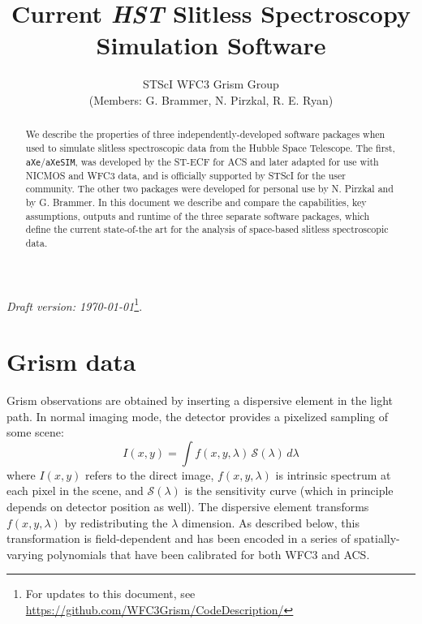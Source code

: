 \documentclass[preprint]{aastex}
\begin{document}
\title{Current \textit{HST} Slitless Spectroscopy Simulation Software}

\author{STScI WFC3 Grism Group \\ (Members: G. Brammer, N. Pirzkal, R. E. Ryan)}

\begin{abstract}
    We describe the properties of three independently-developed software packages when used to simulate slitless spectroscopic data from the Hubble Space Telescope.  The first, \texttt{aXe}/\texttt{aXeSIM}, was developed by the ST-ECF for ACS and later adapted for use with NICMOS and WFC3 data,  and is officially supported by STScI for the user community.  The other two packages were developed for personal use by N. Pirzkal and by G. Brammer.  In this document we describe and compare the capabilities, key assumptions, outputs and runtime of the three separate software packages, which define the current state-of-the art for the analysis of space-based slitless spectroscopic data.
    
\end{abstract}

\textit{Draft version: \today}\footnote{For updates to this document, see
\url{https://github.com/WFC3Grism/CodeDescription/}}.

\section{Grism data}




Grism observations are obtained by inserting a dispersive element in the light path.  In normal imaging mode, the detector provides a pixelized sampling of some scene:
\begin{dmath}
I(x,y) = \int f(x,y,\lambda)\,\mathcal{S}(\lambda)\,d\lambda
\end{dmath}
where $I(x,y)$ refers to the direct image, $f(x,y,\lambda)$ is intrinsic spectrum at each pixel in the scene, and $\mathcal{S}(\lambda)$ is the sensitivity curve (which in principle depends on detector position as well). The dispersive element transforms $f(x,y,\lambda)$ by redistributing the $\lambda$ dimension.  As described below, this transformation is field-dependent and has been encoded in a series of spatially-varying polynomials that have been calibrated for both WFC3 and ACS.
\end{document}

